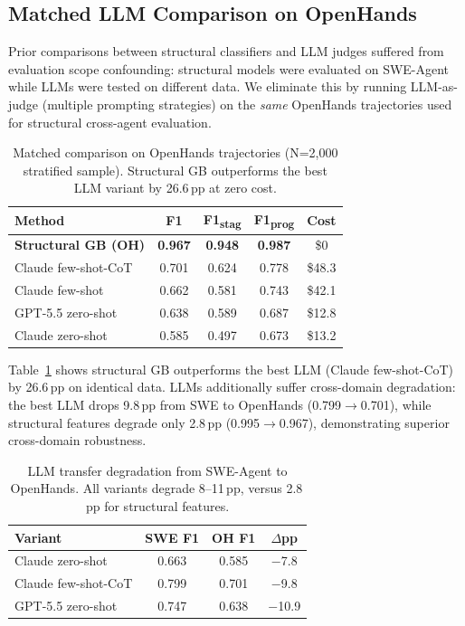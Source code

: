 \documentclass[11pt,a4paper]{article}
\begin{document}
\subsection{Matched LLM Comparison on OpenHands}
\label{sec:llm_oh}

Prior comparisons between structural classifiers and LLM judges suffered from evaluation scope confounding: structural models were evaluated on SWE-Agent while LLMs were tested on different data.
We eliminate this by running LLM-as-judge (multiple prompting strategies) on the \emph{same} OpenHands trajectories used for structural cross-agent evaluation.

\begin{table}[t]
\centering
\small
\begin{tabular}{lcccc}
\toprule
\textbf{Method} & \textbf{F1} & \textbf{F1\textsubscript{stag}} & \textbf{F1\textsubscript{prog}} & \textbf{Cost} \\
\midrule
\textbf{Structural GB (OH)} & \textbf{0.967} & \textbf{0.948} & \textbf{0.987} & \$0 \\
Claude few-shot-CoT & 0.701 & 0.624 & 0.778 & \$48.3 \\
Claude few-shot & 0.662 & 0.581 & 0.743 & \$42.1 \\
GPT-5.5 zero-shot & 0.638 & 0.589 & 0.687 & \$12.8 \\
Claude zero-shot & 0.585 & 0.497 & 0.673 & \$13.2 \\
\bottomrule
\end{tabular}
\caption{Matched comparison on OpenHands trajectories (N=2{,}000 stratified sample). Structural GB outperforms the best LLM variant by 26.6\,pp at zero cost.}
\label{tab:llm_oh}
\end{table}

Table~\ref{tab:llm_oh} shows structural GB outperforms the best LLM (Claude few-shot-CoT) by 26.6\,pp on identical data.
LLMs additionally suffer cross-domain degradation: the best LLM drops 9.8\,pp from SWE to OpenHands (0.799$\to$0.701), while structural features degrade only 2.8\,pp (0.995$\to$0.967), demonstrating superior cross-domain robustness.

\begin{table}[t]
\centering
\small
\begin{tabular}{lccc}
\toprule
\textbf{Variant} & \textbf{SWE F1} & \textbf{OH F1} & \textbf{$\Delta$pp} \\
\midrule
Claude zero-shot & 0.663 & 0.585 & $-$7.8 \\
Claude few-shot-CoT & 0.799 & 0.701 & $-$9.8 \\
GPT-5.5 zero-shot & 0.747 & 0.638 & $-$10.9 \\
\bottomrule
\end{tabular}
\caption{LLM transfer degradation from SWE-Agent to OpenHands. All variants degrade 8--11\,pp, versus 2.8\,pp for structural features.}
\label{tab:llm_transfer}
\end{table}
\end{document}
